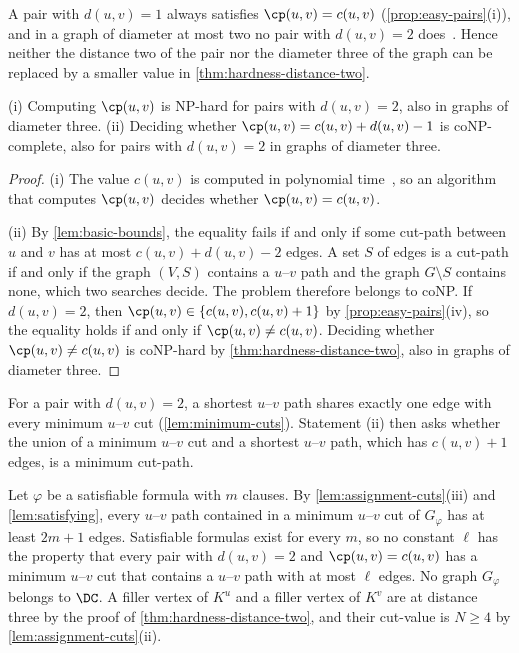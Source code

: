 A pair with $d(u, v) = 1$ always satisfies $\cp(u, v) = c(u, v)$ (\cref{prop:easy-pairs}(i)), and in a graph of diameter at most two no pair with $d(u, v) = 2$ does~\cite[Theorem~15]{Michel2025MinCutPath}.
Hence neither the distance two of the pair nor the diameter three of the graph can be replaced by a smaller value in \cref{thm:hardness-distance-two}.

\begin{corollary}
\label{cor:distance-two}
(i) Computing $\cp(u, v)$ is NP-hard for pairs with $d(u, v) = 2$, also in graphs of diameter three.
(ii) Deciding whether $\cp(u, v) = c(u, v) + d(u, v) - 1$ is coNP-complete, also for pairs with $d(u, v) = 2$ in graphs of diameter three.
\end{corollary}

\begin{proof}
(i) The value $c(u, v)$ is computed in polynomial time~\cite[Sections~10.3 and~10.4]{Erickson2019Algorithms}, so an algorithm that computes $\cp(u, v)$ decides whether $\cp(u, v) = c(u, v)$.

(ii) By \cref{lem:basic-bounds}, the equality fails if and only if some cut-path between $u$ and $v$ has at most $c(u, v) + d(u, v) - 2$ edges.
A set $S$ of edges is a cut-path if and only if the graph $(V, S)$ contains a $u$--$v$ path and the graph $G \setminus S$ contains none, which two searches decide.
The problem therefore belongs to coNP.
If $d(u, v) = 2$, then $\cp(u, v) \in \{c(u, v), c(u, v) + 1\}$ by \cref{prop:easy-pairs}(iv), so the equality holds if and only if $\cp(u, v) \neq c(u, v)$.
Deciding whether $\cp(u, v) \neq c(u, v)$ is coNP-hard by \cref{thm:hardness-distance-two}, also in graphs of diameter three.
\end{proof}

For a pair with $d(u, v) = 2$, a shortest $u$--$v$ path shares exactly one edge with every minimum $u$--$v$ cut (\cref{lem:minimum-cuts}).
Statement (ii) then asks whether the union of a minimum $u$--$v$ cut and a shortest $u$--$v$ path, which has $c(u, v) + 1$ edges, is a minimum cut-path.

\begin{remark}
\label{rem:formula-graph}
Let $\varphi$ be a satisfiable formula with $m$ clauses.
By \cref{lem:assignment-cuts}(iii) and \cref{lem:satisfying}, every $u$--$v$ path contained in a minimum $u$--$v$ cut of $G_\varphi$ has at least $2m + 1$ edges.
Satisfiable formulas exist for every $m$, so no constant $\ell$ has the property that every pair with $d(u, v) = 2$ and $\cp(u, v) = c(u, v)$ has a minimum $u$--$v$ cut that contains a $u$--$v$ path with at most $\ell$ edges.
No graph $G_\varphi$ belongs to $\DC$.
A filler vertex of $K^u$ and a filler vertex of $K^v$ are at distance three by the proof of \cref{thm:hardness-distance-two}, and their cut-value is $N \geq 4$ by \cref{lem:assignment-cuts}(ii).
\end{remark}

